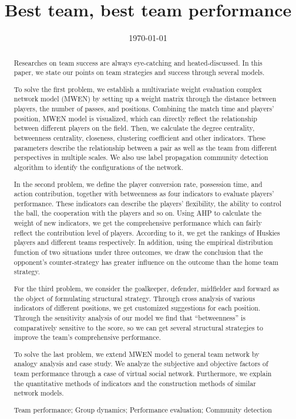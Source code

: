 \documentclass{mcmthesis}
\title{Best team, best team performance }%
\date{\today}
\begin{document}
\begin{abstract}
Researches on team success are always eye-catching and heated-discussed. In this paper, we state our points on team strategies and success through several models.

To solve the first problem, we establish a multivariate weight evaluation complex network model (MWEN) by setting up a weight matrix through the distance between players, the number of passes, and positions. Combining the match time and players' position, MWEN model is visualized, which can directly reflect the relationship between different players on the field. Then, we calculate the degree centrality, betweenness centrality, closeness, clustering coefficient and other indicators. These parameters describe the relationship between a pair as well as the team from different perspectives in multiple scales. We also use label propagation community detection algorithm to identify the configurations of the network.


In the second problem, we define the player conversion rate, possession time, and action contribution, together with betweenness as four indicators to evaluate players’ performance. These indicators can describe the players' flexibility, the ability to control the ball, the cooperation with the players and so on. Using AHP to calculate the weight of new indicators, we get the comprehensive performance which can fairly reflect the contribution level of players. According to it, we get the rankings of Huskies players and different teams respectively. In addition, using the empirical distribution function of two situations under three outcomes, we draw the conclusion that the opponent's counter-strategy has greater influence on the outcome than the home team strategy.

For the third problem, we consider the goalkeeper, defender, midfielder and forward as the object of formulating structural strategy. Through cross analysis of various indicators of different positions, we get customized suggestions for each position. Through the sensitivity analysis of our model we find that “betweenness” is comparatively sensitive to the score, so we can get several structural strategies to improve the team's comprehensive performance.

To solve the last problem, we extend MWEN model to general team network by analogy analysis and case study. We analyze the subjective and objective factors of team performance through a case of virtual social network. Furthermore, we explain the quantitative methods of indicators and the construction methods of similar network models.

\begin{keywords}
Team performance; Group dynamics; Performance evaluation; Community detection 
\end{keywords}
\end{abstract}
\maketitle
\tableofcontents
\newpage
\end{document}
